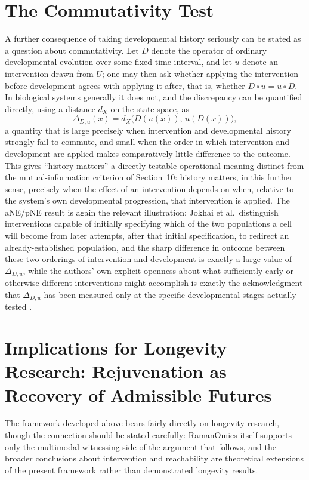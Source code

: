 \documentclass[11pt]{article}
\begin{document}
\section{The Commutativity Test}

A further consequence of taking developmental history seriously can be stated as a question about commutativity. Let $D$ denote the operator of ordinary developmental evolution over some fixed time interval, and let $u$ denote an intervention drawn from $U$; one may then ask whether applying the intervention before development agrees with applying it after, that is, whether $D \circ u = u \circ D$. In biological systems generally it does not, and the discrepancy can be quantified directly, using a distance $d_X$ on the state space, as
\begin{equation}
\Delta_{D,u}(x) = d_X\bigl(D(u(x)),\, u(D(x))\bigr),
\end{equation}
a quantity that is large precisely when intervention and developmental history strongly fail to commute, and small when the order in which intervention and development are applied makes comparatively little difference to the outcome. This gives ``history matters'' a directly testable operational meaning distinct from the mutual-information criterion of Section~10: history matters, in this further sense, precisely when the effect of an intervention depends on when, relative to the system's own developmental progression, that intervention is applied. The aNE/pNE result is again the relevant illustration: Jokhai et al.\ distinguish interventions capable of initially specifying which of the two populations a cell will become from later attempts, after that initial specification, to redirect an already-established population, and the sharp difference in outcome between these two orderings of intervention and development is exactly a large value of $\Delta_{D,u}$, while the authors' own explicit openness about what sufficiently early or otherwise different interventions might accomplish is exactly the acknowledgment that $\Delta_{D,u}$ has been measured only at the specific developmental stages actually tested \cite{jokhai2026}.

\section{Implications for Longevity Research: Rejuvenation as Recovery of Admissible Futures}

The framework developed above bears fairly directly on longevity research, though the connection should be stated carefully: RamanOmics itself supports only the multimodal-witnessing side of the argument that follows, and the broader conclusions about intervention and reachability are theoretical extensions of the present framework rather than demonstrated longevity results.
\end{document}
